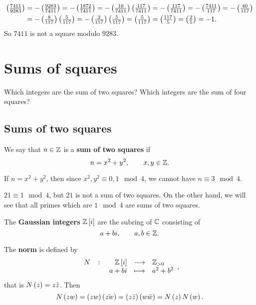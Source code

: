 \begin{example*}
\begin{align*}
\jacobi{7411}{9283}
& = -\jacobi{9283}{7411} = -\jacobi{1872}{7411} = -\jacobi{16}{7411}\jacobi{117}{7411} = -\jacobi{117}{7411} = -\jacobi{7411}{117} = -\jacobi{40}{117} \\
& = -\jacobi{8}{117}\jacobi{5}{117} = -\jacobi{2}{117}\jacobi{5}{117} = \jacobi{5}{117} = \jacobi{117}{5} = \jacobi{2}{5} = -1.
\end{align*}
So $ 7411 $ is not a square modulo $ 9283 $.
\end{example*}

\pagebreak

\section{Sums of squares}

Which integers are the sum of two squares? Which integers are the sum of four squares?

\subsection{Sums of two squares}

\begin{definition}
We say that $ n \in \mathbb{Z} $ is a \textbf{sum of two squares} if
$$ n = x^2 + y^2, \qquad x, y \in \mathbb{Z}. $$
\end{definition}

\begin{example*}
If $ n = x^2 + y^2 $, then since $ x^2, y^2 \equiv 0, 1 \mod 4 $, we cannot have $ n \equiv 3 \mod 4 $.
\end{example*}

\begin{example*}
$ 21 \equiv 1 \mod 4 $, but $ 21 $ is not a sum of two squares. On the other hand, we will see that all primes which are $ 1 \mod 4 $ are sums of two squares.
\end{example*}

\begin{definition}
The \textbf{Gaussian integers} $ \Z\sbr{i} $ are the subring of $ \mathbb{C} $ consisting of
$$ a + bi, \qquad a, b \in \mathbb{Z}. $$
\end{definition}

The \textbf{norm} is defined by
$$ \function[N]{\Z\sbr{i}}{\Z_{> 0}}{a + bi}{a^2 + b^2}, $$
that is $ N\br{z} = z\bar{z} $. Then
$$ N\br{zw} = \br{zw}\br{\bar{zw}} = \br{z\bar{z}}\br{w\bar{w}} = N\br{z}N\br{w}. $$

